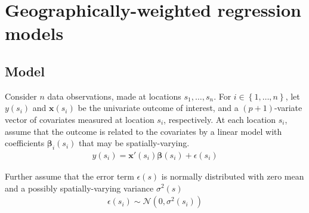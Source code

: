 \documentclass[authoryear, review, 11pt]{elsarticle}
\begin{document}
	

	
\section{Geographically-weighted regression models \label{section:model}}

	\subsection{Model}
	Consider $n$ data observations, made at locations $s_1, \dots, s_n$. For $i \in \left\{1, \dots, n \right\}$, let $y(s_i)$ and $\bm{x}(s_i)$ be the univariate outcome of interest, and a $(p+1)$-variate vector of covariates measured at location $s_i$, respectively. At each location $s_i$, assume that the outcome is related to the covariates by a linear model with coefficients $\bm{\beta}_i(s_i)$ that may be spatially-varying.
	\begin{eqnarray}
		y(s_i) = \bm{x}'(s_i) \bm{\beta}(s_i) + \epsilon(s_i)
	\label{eq:lm(s)}
	\end{eqnarray}
	
	Further assume that the error term $\epsilon(s)$ is normally distributed with zero mean and a possibly spatially-varying variance $\sigma^2(s)$
	\begin{eqnarray}
		\epsilon(s_i) \sim \mathcal{N} \left( 0,\sigma^2(s_i) \right)
	\label{eq:err}
	\end{eqnarray}
	
\end{document}
